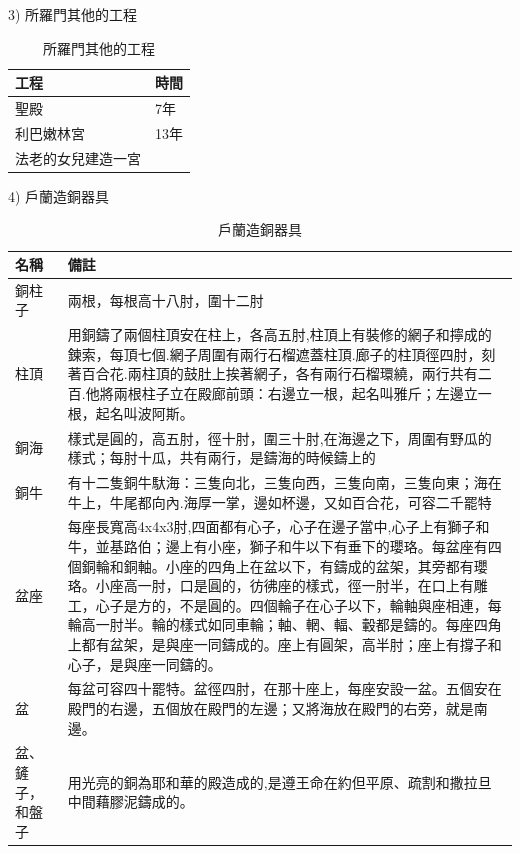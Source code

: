 \documentclass{ctexart}
\begin{document}
\begin{description}
\item   3) 所羅門其他的工程
 \begin{table}[!hbp]
\centering
\begin{tabular}{|p{2.5cm}|p{12cm}|}
\hline
\hline
工程      &時間    \\\hline\hline
 聖殿   & 7年  \\\hline
利巴嫩林宮 & 13年  \\\hline
法老的女兒建造一宮   & \\\hline
\end{tabular}
\caption{所羅門其他的工程}
\end{table}



\item   4) 戶蘭造銅器具 
\begin{table}[!hbp]
\centering
\begin{tabular}{|p{2.5cm}|p{12cm}|}
\hline
\hline
名稱      & 備註   \\\hline\hline
銅柱子  & 兩根，每根高十八肘，圍十二肘\\\hline
柱頂&用銅鑄了兩個柱頂安在柱上，各高五肘,柱頂上有裝修的網子和擰成的鍊索，每頂七個.網子周圍有兩行石榴遮蓋柱頂.廊子的柱頂徑四肘，刻著百合花.兩柱頂的鼓肚上挨著網子，各有兩行石榴環繞，兩行共有二百.他將兩根柱子立在殿廊前頭：右邊立一根，起名叫雅斤；左邊立一根，起名叫波阿斯。\\\hline
銅海   &  樣式是圓的，高五肘，徑十肘，圍三十肘,在海邊之下，周圍有野瓜的樣式；每肘十瓜，共有兩行，是鑄海的時候鑄上的        \\\hline
銅牛  & 有十二隻銅牛馱海：三隻向北，三隻向西，三隻向南，三隻向東；海在牛上，牛尾都向內.海厚一掌，邊如杯邊，又如百合花，可容二千罷特 \\\hline
盆座&每座長寬高4x4x3肘,四面都有心子，心子在邊子當中,心子上有獅子和牛，並基路伯；邊上有小座，獅子和牛以下有垂下的瓔珞。每盆座有四個銅輪和銅軸。小座的四角上在盆以下，有鑄成的盆架，其旁都有瓔珞。小座高一肘，口是圓的，彷彿座的樣式，徑一肘半，在口上有雕工，心子是方的，不是圓的。四個輪子在心子以下，輪軸與座相連，每輪高一肘半。輪的樣式如同車輪；軸、輞、輻、轂都是鑄的。每座四角上都有盆架，是與座一同鑄成的。座上有圓架，高半肘；座上有撐子和心子，是與座一同鑄的。 \\\hline
盆&每盆可容四十罷特。盆徑四肘，在那十座上，每座安設一盆。五個安在殿門的右邊，五個放在殿門的左邊；又將海放在殿門的右旁，就是南邊。 \\\hline
盆、鏟子，和盤子&用光亮的銅為耶和華的殿造成的,是遵王命在約但平原、疏割和撒拉旦中間藉膠泥鑄成的。\\\hline
\end{tabular}
\caption{戶蘭造銅器具}
\end{table}


\end{description}
\end{document}
